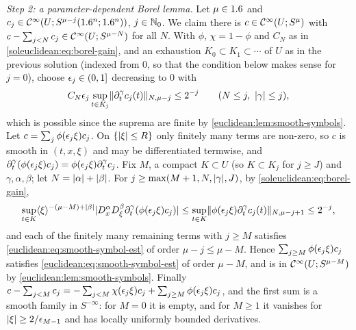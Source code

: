 \emph{Step 2: a parameter-dependent Borel lemma.} Let $\mu\in1.6$ and
$c_j\in\mathcal{C}^\infty(U;S^{\mu-j}(1.6^n;1.6^n))$, $j\in\mathbb{N}_0$. We claim there is
$c\in\mathcal{C}^\infty(U;S^\mu)$ with $c-\sum_{j<N}c_j\in\mathcal{C}^\infty(U;S^{\mu-N})$ for all $N$. With $\phi$,
$\chi=1-\phi$ and $C_N$ as in \eqref{soleuclidean:eq:borel-gain}, and an exhaustion
$K_0\subset K_1\subset\cdots$ of $U$ as in the previous solution (indexed from $0$, so
that the condition below makes sense for $j=0$), choose $\epsilon_j\in(0,1]$
decreasing to $0$ with
\begin{equation*}
  C_N\epsilon_j\sup_{t\in K_j}\lVert \partial^\gamma_tc_j(t)\rVert_{N,\mu-j}\le2^{-j}\qquad
  (N\le j,\ \lvert \gamma\rvert\le j),
\end{equation*}
which is possible since the suprema are finite by \cref{euclidean:lem:smooth-symbols}. Let
$c=\sum_j\phi(\epsilon_j\xi)c_j$. On $\{\lvert \xi\rvert\le R\}$ only finitely many terms are non-zero,
so $c$ is smooth in $(t,x,\xi)$ and may be differentiated termwise, and
$\partial^\gamma_t(\phi(\epsilon_j\xi)c_j)=\phi(\epsilon_j\xi)\partial^\gamma_tc_j$. Fix $M$, a compact
$K\subset U$ (so $K\subset K_j$ for $j\ge J$) and $\gamma,\alpha,\beta$; let
$N=\lvert \alpha\rvert+\lvert \beta\rvert$. For $j\ge\max(M+1,N,\lvert \gamma\rvert,J)$, by
\eqref{soleuclidean:eq:borel-gain},
\begin{equation*}
  \sup_{t\in K}\langle \xi\rangle^{-(\mu-M)+\lvert \beta\rvert}\lvert D^\alpha_xD^\beta_\xi\partial^\gamma_t(\phi(\epsilon_j\xi)c_j)\rvert
  \le\sup_{t\in K}\lVert \phi(\epsilon_j\xi)\partial^\gamma_tc_j(t)\rVert_{N,\mu-j+1}\le2^{-j},
\end{equation*}
and each of the finitely many remaining terms with $j\ge M$ satisfies
\eqref{euclidean:eq:smooth-symbol-est} of order $\mu-j\le\mu-M$. Hence
$\sum_{j\ge M}\phi(\epsilon_j\xi)c_j$ satisfies \eqref{euclidean:eq:smooth-symbol-est} of order
$\mu-M$, and is in $\mathcal{C}^\infty(U;S^{\mu-M})$ by \cref{euclidean:lem:smooth-symbols}. Finally
$c-\sum_{j<M}c_j=-\sum_{j<M}\chi(\epsilon_j\xi)c_j+\sum_{j\ge M}\phi(\epsilon_j\xi)c_j$, and the
first sum is a smooth family in $S^{-\infty}$: for $M=0$ it is empty, and for $M\ge1$ it
vanishes for $\lvert \xi\rvert\ge2/\epsilon_{M-1}$ and has locally uniformly bounded derivatives.


